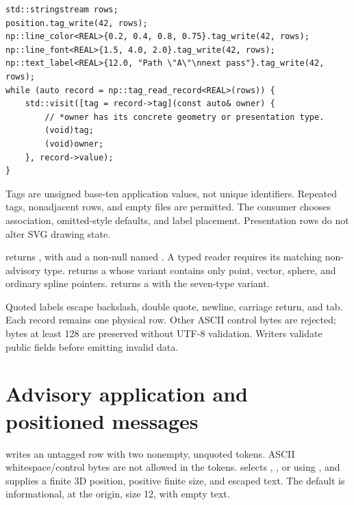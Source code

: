 \begin{lstlisting}
std::stringstream rows;
position.tag_write(42, rows);
np::line_color<REAL>{0.2, 0.4, 0.8, 0.75}.tag_write(42, rows);
np::line_font<REAL>{1.5, 4.0, 2.0}.tag_write(42, rows);
np::text_label<REAL>{12.0, "Path \"A\"\nnext pass"}.tag_write(42, rows);
while (auto record = np::tag_read_record<REAL>(rows)) {
    std::visit([tag = record->tag](const auto& owner) {
        // *owner has its concrete geometry or presentation type.
        (void)tag;
        (void)owner;
    }, record->value);
}
\end{lstlisting}

Tags are unsigned base-ten  application values, not unique
identifiers. Repeated tags, nonadjacent rows, and empty files are permitted.
The consumer chooses association, omitted-style defaults, and label placement.
Presentation rows do not alter SVG drawing state.

 returns
, with  and a non-null
 named . A typed reader requires its
matching non-advisory type.  returns a
 whose  variant contains only point,
vector, sphere, and ordinary spline pointers. 
returns a  with the seven-type  variant.

Quoted labels escape backslash, double quote, newline, carriage return, and
tab. Each record remains one physical row. Other ASCII control bytes are
rejected; bytes at least 128 are preserved without UTF-8 validation. Writers
validate public fields before emitting invalid data.

\section{Advisory application and positioned messages}
 writes an untagged row with two nonempty, unquoted
tokens. ASCII whitespace/control bytes are not allowed in the tokens.
 selects , , or
 using , and supplies a finite 3D position,
positive finite size, and escaped text. The default is informational, at the
origin, size 12, with empty text.

